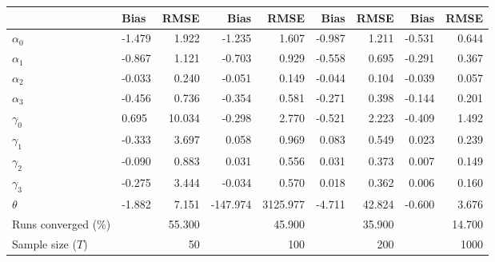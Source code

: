 
\begin{tabular}[t]{llrrrrrrr}
\toprule
  & Bias & RMSE & Bias & RMSE & Bias & RMSE & Bias & RMSE\\
\midrule
$\alpha_{0}$ & -1.479 & 1.922 & -1.235 & 1.607 & -0.987 & 1.211 & -0.531 & 0.644\\
$\alpha_{1}$ & -0.867 & 1.121 & -0.703 & 0.929 & -0.558 & 0.695 & -0.291 & 0.367\\
$\alpha_{2}$ & -0.033 & 0.240 & -0.051 & 0.149 & -0.044 & 0.104 & -0.039 & 0.057\\
$\alpha_{3}$ & -0.456 & 0.736 & -0.354 & 0.581 & -0.271 & 0.398 & -0.144 & 0.201\\
$\gamma_{0}$ & 0.695 & 10.034 & -0.298 & 2.770 & -0.521 & 2.223 & -0.409 & 1.492\\
$\gamma_{1}$ & -0.333 & 3.697 & 0.058 & 0.969 & 0.083 & 0.549 & 0.023 & 0.239\\
$\gamma_{2}$ & -0.090 & 0.883 & 0.031 & 0.556 & 0.031 & 0.373 & 0.007 & 0.149\\
$\gamma_{3}$ & -0.275 & 3.444 & -0.034 & 0.570 & 0.018 & 0.362 & 0.006 & 0.160\\
$\theta$ & -1.882 & 7.151 & -147.974 & 3125.977 & -4.711 & 42.824 & -0.600 & 3.676\\
Runs converged (\%) &  & 55.300 &  & 45.900 &  & 35.900 &  & 14.700\\
Sample size ($T$) &  & 50 &  & 100 &  & 200 &  & 1000\\
\bottomrule
\end{tabular}
